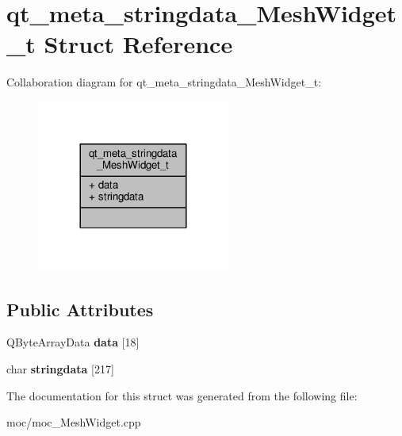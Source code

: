 \hypertarget{structqt__meta__stringdata___mesh_widget__t}{\section{qt\-\_\-meta\-\_\-stringdata\-\_\-\-Mesh\-Widget\-\_\-t Struct Reference}
\label{structqt__meta__stringdata___mesh_widget__t}
}


Collaboration diagram for qt\-\_\-meta\-\_\-stringdata\-\_\-\-Mesh\-Widget\-\_\-t\-:
\nopagebreak
\begin{figure}[H]
\begin{center}
\leavevmode
\includegraphics[width=180pt]{structqt__meta__stringdata___mesh_widget__t__coll__graph}
\end{center}
\end{figure}
\subsection*{Public Attributes}
\begin{DoxyCompactItemize}
\item 
\hypertarget{structqt__meta__stringdata___mesh_widget__t_a66138c6a5c9b34abd6bf26fe9bacaf67}{Q\-Byte\-Array\-Data {\bfseries data} \mbox{[}18\mbox{]}}\label{structqt__meta__stringdata___mesh_widget__t_a66138c6a5c9b34abd6bf26fe9bacaf67}

\item 
\hypertarget{structqt__meta__stringdata___mesh_widget__t_aa446fd8b6ecdddceb5754fa91cb85b1c}{char {\bfseries stringdata} \mbox{[}217\mbox{]}}\label{structqt__meta__stringdata___mesh_widget__t_aa446fd8b6ecdddceb5754fa91cb85b1c}

\end{DoxyCompactItemize}


The documentation for this struct was generated from the following file\-:\begin{DoxyCompactItemize}
\item 
moc/moc\-\_\-\-Mesh\-Widget.\-cpp\end{DoxyCompactItemize}
